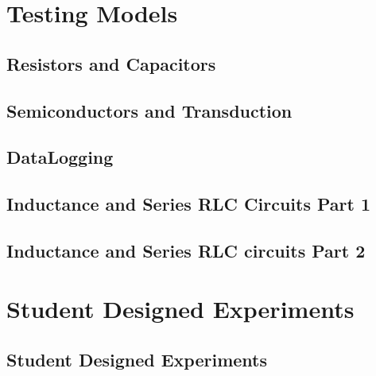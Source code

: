 \documentclass{book}
\begin{document}
\part{Testing Models}

	\chapter{Resistors and Capacitors}
		
	
	\chapter{Semiconductors and Transduction}
		
	
	\chapter{DataLogging}
		
		
	\chapter{Inductance and Series RLC Circuits Part 1}
		
	
	\chapter{Inductance and Series RLC circuits Part 2}
		


\part{Student Designed Experiments}

	\chapter{Student Designed Experiments\label{Student Designed Experiments}}
		
			
			
\end{document}
